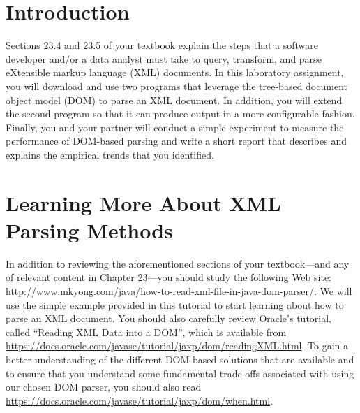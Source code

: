 


\usepackage[compact]{titlesec}



\section*{Introduction}

Sections 23.4 and 23.5 of your textbook explain the steps that a software developer and/or a data analyst must take to
query, transform, and parse eXtensible markup language (XML) documents. In this laboratory assignment, you will download
and use two programs that leverage the tree-based document object model (DOM) to parse an XML document.  In addition,
you will extend the second program so that it can produce output in a more configurable fashion.  Finally, you and your
partner will conduct a simple experiment to measure the performance of DOM-based parsing and write a short report that
describes and explains the empirical trends that you identified.

\vspace*{-.05in}
\section*{Learning More About XML Parsing Methods}

In addition to reviewing the aforementioned sections of your textbook---and any of relevant content in Chapter 23---you
should study the following Web site: \url{http://www.mkyong.com/java/how-to-read-xml-file-in-java-dom-parser/}. We will
use the simple example provided in this tutorial to start learning about how to parse an XML document.  You should also
carefully review Oracle's tutorial, called ``Reading XML Data into a DOM'', which is available from
\url{https://docs.oracle.com/javase/tutorial/jaxp/dom/readingXML.html}. To gain a better understanding of the different
DOM-based solutions that are available and to ensure that you understand some fundamental trade-offs associated with
using our chosen DOM parser, you should also read \url{https://docs.oracle.com/javase/tutorial/jaxp/dom/when.html}.

\vspace*{-.05in}
